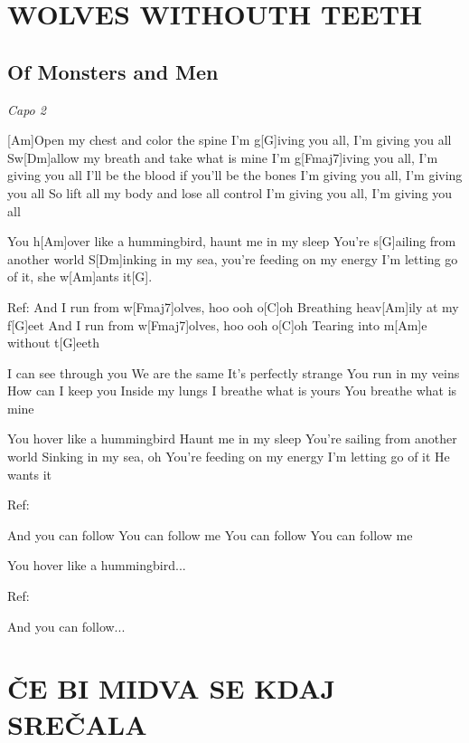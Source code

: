 \documentclass{article}
\begin{document}
\section*{WOLVES WITHOUTH TEETH}
%
\subsection*{Of Monsters and Men}
\begin{guitar}
	\textit{Capo 2}
	
	 
	[Am]Open my chest and color the spine
	I'm g[G]iving you all, I'm giving you all
	Sw[Dm]allow my breath and take what is mine
	I'm g[Fmaj7]iving you all, I'm giving you all
	I'll be the blood if you'll be the bones
	I'm giving you all, I'm giving you all
	So lift all my body and lose all control
	I'm giving you all, I'm giving you all
	
    You h[Am]over like a hummingbird, haunt me in my sleep
    You're s[G]ailing from another world
    S[Dm]inking in my sea, you're feeding on my energy
    I'm letting go of it, she w[Am]ants it[G].
    
    
    Ref:
    And I run from w[Fmaj7]olves, hoo ooh o[C]oh
    Breathing heav[Am]ily at my f[G]eet
    And I run from w[Fmaj7]olves, hoo ooh o[C]oh
    Tearing into m[Am]e without t[G]eeth
    
    
    
    I can see through you
    We are the same
    It's perfectly strange
    You run in my veins
    How can I keep you
    Inside my lungs
    I breathe what is yours
    You breathe what is mine
    
    You hover like a hummingbird
    Haunt me in my sleep
    You're sailing from another world
    Sinking in my sea, oh
    You're feeding on my energy
    I'm letting go of it
    He wants it
    
	Ref:
    
    And you can follow
    You can follow me
    You can follow
    You can follow me
    
    You hover like a hummingbird...

    Ref:
    
    And you can follow...

 
	
\end{guitar}

\section*{ČE BI MIDVA SE KDAJ SREČALA}
%
\end{document}
